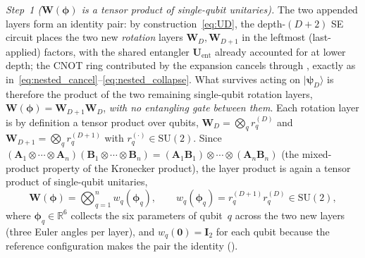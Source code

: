 \documentclass[11pt]{article}
\newcommand{\SU}{\mathrm{SU}}
\newcommand{\bbR}{\mathbb{R}}
\theoremstyle{plain}
\theoremstyle{plain}
\begin{document}
\emph{Step~1 ($\mathbf{W}(\bm\phi)$ is a tensor product of single-qubit
unitaries).}
The two appended layers form an identity pair: by
construction~\eqref{eq:UD}, the depth-$(D{+}2)$ SE circuit places the
two new \emph{rotation} layers $\mathbf{W}_D,\mathbf{W}_{D+1}$ in the leftmost
(last-applied) factors, with the shared entangler $\mathbf{U}_{\mathrm{ent}}$
already accounted for at lower depth; the CNOT ring contributed by the
expansion cancels through , exactly as
in~\eqref{eq:nested_cancel}--\eqref{eq:nested_collapse}.  What survives
acting on $|\boldsymbol{\psi}_D\rangle$ is therefore the product of the two
remaining single-qubit rotation layers,
$\mathbf{W}(\bm\phi)=\mathbf{W}_{D+1}\mathbf{W}_D$, \emph{with no entangling gate between
them}.  Each rotation layer is by definition a tensor product over
qubits, $\mathbf{W}_D=\bigotimes_q r_q^{(D)}$ and
$\mathbf{W}_{D+1}=\bigotimes_q r_q^{(D+1)}$ with $r_q^{(\cdot)}\in\SU(2)$.
Since $(\mathbf{A}_1\otimes\cdots\otimes\mathbf{A}_n)(\mathbf{B}_1\otimes\cdots\otimes\mathbf{B}_n)
=(\mathbf{A}_1\mathbf{B}_1)\otimes\cdots\otimes(\mathbf{A}_n\mathbf{B}_n)$ (the mixed-product
property of the Kronecker product), the layer product is again a tensor
product of single-qubit unitaries,
\begin{equation}\label{eq:W_tensor_app}
  \mathbf{W}(\bm\phi)=\bigotimes_{q=1}^n w_q(\bm\phi_q),
  \qquad w_q(\bm\phi_q)=r_q^{(D+1)} r_q^{(D)}\in\SU(2),
\end{equation}
where $\bm\phi_q\in\bbR^6$ collects the six parameters of qubit~$q$
across the two new layers (three Euler angles per layer), and
$w_q(\bm 0)=\mathbf{I}_2$ for each qubit because the reference configuration
makes the pair the identity ().
\end{document}
